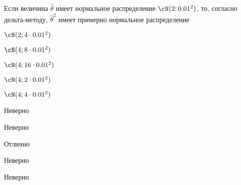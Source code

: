
\begin{question}
Если величина \(\hat\theta\) имеет нормальное распределение
\(\cN(2;0.01^2)\), то, согласно дельта-методу, \(\hat\theta^2\) имеет
примерно нормальное распределение
\begin{answerlist}
  \item \(\cN(2;4\cdot 0.01^2)\)
  \item \(\cN(4;8\cdot 0.01^2)\)
  \item \(\cN(4;16\cdot 0.01^2)\)
  \item \(\cN(4;2\cdot 0.01^2)\)
  \item \(\cN(4;4\cdot 0.01^2)\)
\end{answerlist}
\end{question}

\begin{solution}
\begin{answerlist}
  \item Неверно
  \item Неверно
  \item Отлично
  \item Неверно
  \item Неверно
\end{answerlist}
\end{solution}

